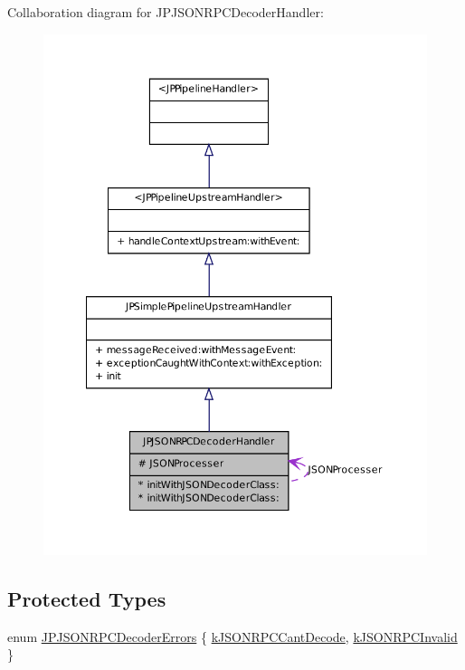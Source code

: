 Collaboration diagram for JPJSONRPCDecoderHandler:\nopagebreak
\begin{figure}[H]
\begin{center}
\leavevmode
\includegraphics[width=352pt]{a00107}
\end{center}
\end{figure}
\subsection*{Protected Types}
\begin{DoxyCompactItemize}
\item 
enum \hyperlink{a00015_aba2b766c1b7742f5c636bbbd578df618}{JPJSONRPCDecoderErrors} \{ \hyperlink{a00015_aba2b766c1b7742f5c636bbbd578df618adaa30b18406ba5a080ea1dddc621b154}{kJSONRPCCantDecode}, 
\hyperlink{a00015_aba2b766c1b7742f5c636bbbd578df618a2500b118aeb7e1f2d305c9edaa6e3376}{kJSONRPCInvalid}
 \}
\end{DoxyCompactItemize}
